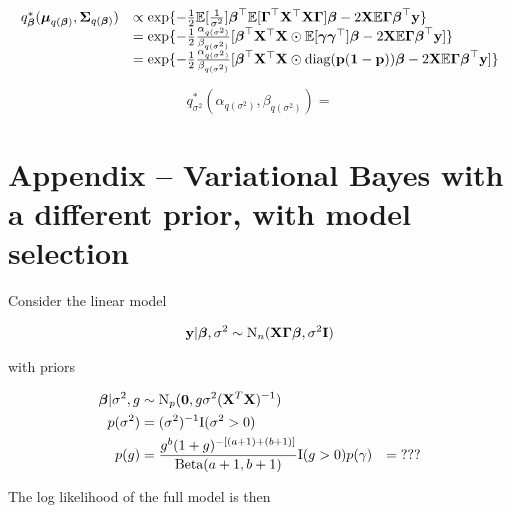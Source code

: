 \documentclass{amsart}[12pt]
\begin{document}
\begin{equation*}
	\begin{array}{rl}
		q^*_{\boldsymbol \beta}({\boldsymbol \mu}_{q({\boldsymbol \beta})}, {\boldsymbol \Sigma}_{q({\boldsymbol \beta})}) & \propto \exp \{ -\tfrac{1}{2} \mathbb{E} [\frac{1}{\sigma^2}] {\boldsymbol\beta}^\top \mathbb{E}[ {\boldsymbol \Gamma}^\top {\bf X}^\top {\bf X} {\boldsymbol\Gamma} ] {\boldsymbol\beta} - 2 {\bf X} \mathbb{E} {\boldsymbol \Gamma} {\boldsymbol \beta}^\top {\bf y} \}                           \\
		                                                  & = \exp\{ -\tfrac{1}{2} \frac{\alpha_{q(\sigma^2)}}{\beta_{q(\sigma^2)}} [{\boldsymbol \beta}^\top {\bf X}^\top {\bf X} \odot \mathbb{E}[{\boldsymbol \gamma} {\boldsymbol \gamma}^\top] {\boldsymbol\beta} - 2 {\bf X} \mathbb{E} {\boldsymbol \Gamma} {\boldsymbol \beta}^\top {\bf y}] \}   \\
		                                                  & = \exp\{ -\tfrac{1}{2} \frac{\alpha_{q(\sigma^2)}}{\beta_{q(\sigma^2)}} [{\boldsymbol \beta}^\top {\bf X}^\top {\bf X} \odot \text{diag}{({\bf p}({\bf1}- {\bf p}))} {\boldsymbol\beta} - 2 {\bf X} \mathbb{E} {\boldsymbol \Gamma} {\boldsymbol \beta}^\top {\bf y}] \} 
	\end{array}
\end{equation*}

\begin{equation*}
	q^*_{\sigma^2}(\alpha_{q(\sigma^2)}, \beta_{q(\sigma^2)}) = 
\end{equation*}

\section{Appendix -- Variational Bayes with a different prior, with model selection}

Consider the linear model

\begin{align*}
	{\bf y} | {\boldsymbol \beta}, \sigma^2 \sim \text{N}_n({\bf X} {\boldsymbol \Gamma} {\boldsymbol \beta}, \sigma^2 {\bf I}) 
\end{align*}

with priors

\begin{align*}
	{\boldsymbol\beta} | \sigma^2, g & \sim \text{N}_p({\bf 0}, g \sigma^2 ({\bf X}^T {\bf X})^{-1})                             \\
	p(\sigma^2)          & = (\sigma^2)^{-1} \text{I}(\sigma^2 > 0)                                         \\
	p(g)                 & = \frac{g^b (1 + g)^{-[(a + 1) + (b + 1)]}}{\text{Beta}(a + 1, b + 1)} \text{I}(g > 0) 
	p(\gamma)            & = \text{???}                                                               
\end{align*}

The log likelihood of the full model is then
\end{document}
